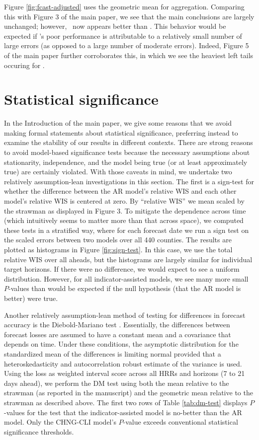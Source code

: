 Figure \ref{fig:fcast-adjusted} uses the geometric
mean for aggregation.  Comparing this with Figure 3 of the main paper,
we see that the main conclusions are largely unchanged; however,
\chngcli~now appears better than \ar.  This behavior would be
expected if \chngcli's poor performance is attributable to a
relatively small number of large errors (as opposed to a large number
of moderate errors).  Indeed, Figure 5 of the main paper further
corroborates this, in which we see the heaviest left tails occuring
for \chngcli.

\section{Statistical significance}

In the Introduction of the main paper, we give some reasons that we avoid making
formal statements about statistical significance, preferring instead to examine
the stability of our results in different contexts. There are strong reasons to
avoid model-based significance tests because the necessary assumptions about
stationarity, independence, and the  model being true (or at least approximately
true) are certainly violated. With those caveats in mind, we undertake two
relatively assumption-lean investigations in this section. The first is a
sign-test for whether the difference between the AR model’s relative WIS  and
each other model’s relative WIS is centered at zero. By ``relative WIS'' we mean
scaled by the strawman as displayed in Figure 3. To mitigate the dependence
across time (which intuitively seems to matter more than that across space), we
computed these tests in a stratified way, where for each forecast date we run a
sign test on the scaled errors between two models over all 440 counties. The
results are plotted as histograms in Figure \ref{fig:sign-test}. In this case,
we use the total relative WIS over all aheads, but the histograms are largely
similar for individual target horizons. If there were no difference, we would
expect to see a uniform distribution. However, for all indicator-assisted
models, we see many more small $P$-values than would be expected if the null
hypothesis (that the AR model is better) were true.

Another relatively assumption-lean method of testing for differences in forecast
accuracy is the Diebold-Mariano test \cite{Diebold:2002,Diebold:2015,harvey1997testing}.
Essentially, the differences between forecast losses are assumed to have a
constant mean and a covariance that depends on time. Under these conditions, the
asymptotic distribution for the standardized mean of the differences is limiting
normal provided that a heteroskedasticity and autocorrelation robust estimate of
the variance is used. Using the loss as weighted interval score across all HRRs
and horizons (7 to 21 days ahead), we perform the DM test using both the mean
relative to the strawman (as reported in the manuscript) and the geometric mean
relative to the strawman as described above. The first two rows of Table
\ref{tab:dm-test} displays 
$P$-values for the test that the indicator-assisted model is no-better than the
AR model. Only the CHNG-CLI model's $P$-value exceeds conventional statistical
significance thresholds.  


